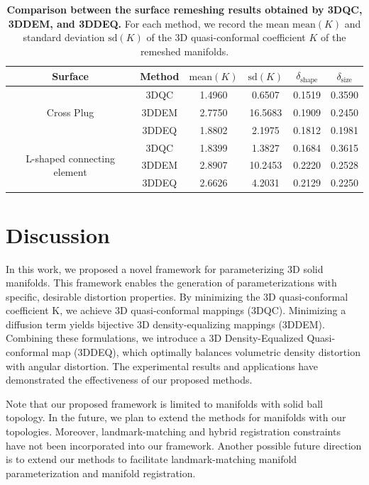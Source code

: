 \documentclass{article}
\begin{document}
\begin{table}[t]
\small
    \caption{\textbf{Comparison between the surface remeshing results obtained by 3DQC, 3DDEM, and 3DDEQ.} For each method, we record the mean $\text{mean}(K)$ and standard deviation $\text{sd}(K)$ of the 3D quasi-conformal coefficient $K$ of the remeshed manifolds.}\label{tab:remshing_comparison}
    
  \begin{center}
  \begin{tabular}{|c|c|c|c|c|c|} \hline
    \bf Surface & \bf Method & \bf $\text{mean}(K)$  & \bf $\text{sd}(K)$ & \bf $\delta_\text{shape}$ & \bf $\delta_\text{size}$  \\ \hline

    \multirow{3}{*}{Cross Plug} & 3DQC & 1.4960 & 0.6507 & 0.1519 & 0.3590  \\ \cline{2-6}
     & 3DDEM  & 2.7750  & 16.5683 & 0.1909 & 0.2450 \\ \cline{2-6}
    & 3DDEQ  & 1.8802 &  2.1975 & 0.1812 & 0.1981   \\ \hline
    
    \multirow{3}{*}{L-shaped connecting element} & 3DQC  & 1.8399  &  1.3827 & 0.1684 & 0.3615 \\ \cline{2-6}
     & 3DDEM  & 2.8907  & 10.2453 & 0.2220 & 0.2528 \\ \cline{2-6}
    & 3DDEQ  & 2.6626  &  4.2031 & 0.2129 & 0.2250  \\ \hline
  \end{tabular}
  
\end{center}
\end{table}
\section{Discussion}\label{sec:discussion}
In this work, we proposed a novel framework for parameterizing 3D solid manifolds. This framework enables the generation of parameterizations with specific, desirable distortion properties. By minimizing the 3D quasi-conformal coefficient K, we achieve 3D quasi-conformal mappings (3DQC). Minimizing a diffusion term yields bijective 3D density-equalizing mappings (3DDEM). Combining these formulations, we introduce a 3D Density-Equalized Quasi-conformal map (3DDEQ), which optimally balances volumetric density distortion with angular distortion. The experimental results and applications have demonstrated the effectiveness of our proposed methods.

Note that our proposed framework is limited to manifolds with solid ball topology. In the future, we plan to extend the methods for manifolds with our topologies. Moreover, landmark-matching and hybrid registration constraints have not been incorporated into our
framework. Another possible future direction is to extend our methods to facilitate landmark-matching manifold parameterization and manifold registration.





\end{document}
